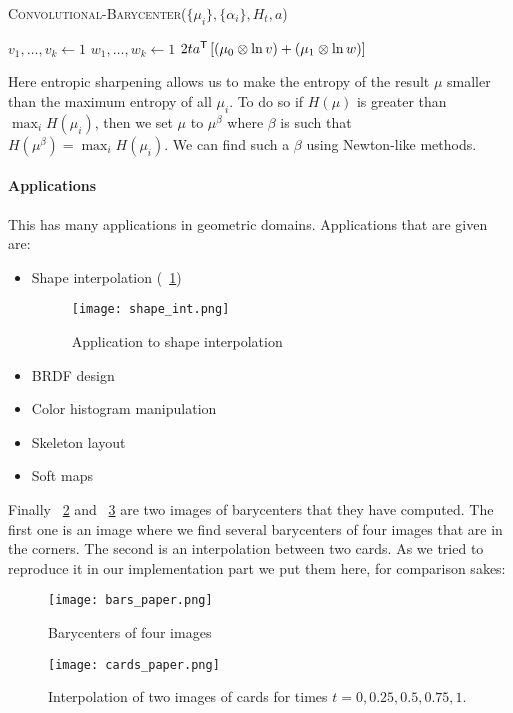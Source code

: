 \vspace{3mm}
\begin{algorithm}[H]
	\caption{\textsc{Convolutional-Barycenter}($\{\mu_i\}, \{ \alpha_i \}, H_t, a$)}
	$v_1, \dots, v_k \gets 1$ \;
	$w_1, \dots, w_k \gets 1$ \;
	\Return $2t a^{\mathsf{T}} \left[ \left( \mu_0 \otimes \ln v \right) + \left( \mu_1 \otimes \ln w \right) \right]$
\end{algorithm}
\vspace{3mm}
Here entropic sharpening allows us to make the entropy of the result $\mu$
smaller than the maximum entropy of all $\mu_i$. To do so if $H(\mu)$
is greater than $\max_i H(\mu_i)$, then we set $\mu$ to $\mu^\beta$ where
$\beta$ is such that $H(\mu^\beta) = \max_i H(\mu_i)$. We can find such a
$\beta$ using Newton-like methods.

\paragraph{Applications}
This has many applications in geometric domains. Applications that are given are:
\begin{itemize}
	\item Shape interpolation (\figurename~\ref{shape})
		\begin{figure}[h]
			\centering
			\texttt{[image: shape\_int.png]}
			\caption{Application to shape interpolation}
			\label{shape}
		\end{figure}
	\item BRDF design
	\item Color histogram manipulation
	\item Skeleton layout
	\item Soft maps
\end{itemize}

Finally \figurename~\ref{barp} and \figurename~\ref{cardp} are two images
of barycenters that they have computed. The first one is an image where
we find several barycenters of four images that are in the corners. The
second is an interpolation between two cards. As we tried to reproduce it
in our implementation part we put them here, for comparison sakes:

\begin{figure}[h]
	\centering
	\texttt{[image: bars\_paper.png]}
	\caption{Barycenters of four images}
	\label{barp}
\end{figure}
\begin{figure}[h]
	\centering
	\texttt{[image: cards\_paper.png]}
	\caption{Interpolation of two images of cards for times $t = 0, 0.25, 0.5, 0.75, 1$.}
	\label{cardp}
\end{figure}
